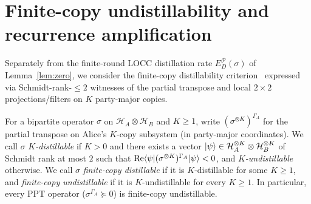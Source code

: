 \section{Finite-copy undistillability and recurrence amplification}

Separately from the finite-round LOCC distillation rate $E_D^{\mathcal{P}}(\sigma)$ of Lemma~\ref{lem:zero}, we consider the finite-copy distillability criterion~\cite{Lewenstein2000Primer} expressed via Schmidt-rank-$\le 2$ witnesses of the partial transpose and local $2\times 2$ projections/filters on $K$ party-major copies.

\begin{definition}
\label{def:finite-copy-undistillable}
\leanok
For a bipartite operator $\sigma$ on $\mathcal{H}_A\otimes\mathcal{H}_B$ and $K\ge 1$, write $(\sigma^{\otimes K})^{\Gamma_A}$ for the partial transpose on Alice's $K$-copy subsystem (in party-major coordinates). We call $\sigma$ \emph{$K$-distillable} if $K>0$ and there exists a vector $|\psi\rangle\in\mathcal{H}_A^{\otimes K}\otimes\mathcal{H}_B^{\otimes K}$ of Schmidt rank at most $2$ such that $\operatorname{Re}\langle \psi|(\sigma^{\otimes K})^{\Gamma_A}|\psi\rangle < 0$, and \emph{$K$-undistillable} otherwise. We call $\sigma$ \emph{finite-copy distillable} if it is $K$-distillable for some $K\ge 1$, and \emph{finite-copy undistillable} if it is $K$-undistillable for every $K\ge 1$. In particular, every PPT operator ($\sigma^{\Gamma_A}\succeq 0$) is finite-copy undistillable.
\end{definition}

